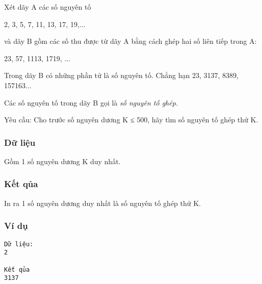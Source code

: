 



   Xét dãy A các số nguyên tố  

   2, 3, 5, 7, 11, 13, 17, 19,...  

   và dãy B gồm các số thu được từ dãy A bằng cách ghép hai số liên tiếp trong A:  

   23, 57, 1113, 1719, ...  

   Trong dãy B có những phần tử là số nguyên tố. Chẳng hạn 23, 3137, 8389, 157163...  

   Các số nguyên tố trong dãy B gọi là   \textit{    số nguyên tố ghép.   }

   Yêu cầu: Cho trước số nguyên dương K ≤ 500, hãy tìm số nguyên tố ghép thứ K.  

\subsubsection{   Dữ liệu  }

   Gồm 1 số nguyên dương K duy nhất.  

\subsubsection{   Kết qủa  }

   In ra 1 số nguyên dương duy nhất là số nguyên tố ghép thứ K.  

\subsubsection{   Ví dụ  }
\begin{verbatim}
Dữ liệu:
2

Kết qủa
3137
\end{verbatim}